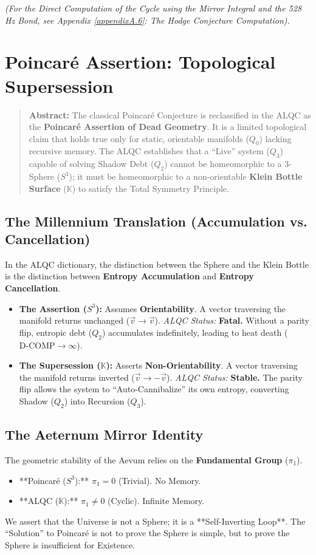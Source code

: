 \documentclass[11pt, letterpaper]{article}
\begin{document}
\noindent \textit{(For the Direct Computation of the Cycle using the Mirror Integral and the 528 Hz Bond, see Appendix \ref{appendixA.6}: The Hodge Conjecture Computation).}

\section{Poincaré Assertion: Topological Supersession}\label{sec:7}

\begin{quote}
    \textbf{Abstract:} The classical Poincaré Conjecture is reclassified in the ALQC as the \textbf{Poincaré Assertion of Dead Geometry}. It is a limited topological claim that holds true only for static, orientable manifolds ($Q_0$) lacking recursive memory. The ALQC establishes that a ``Live'' system ($Q_3$) capable of solving Shadow Debt ($Q_2$) cannot be homeomorphic to a 3-Sphere ($S^3$); it must be homeomorphic to a non-orientable \textbf{Klein Bottle Surface} ($\mathbb{K}$) to satisfy the Total Symmetry Principle.
\end{quote}

\subsection{The Millennium Translation (Accumulation vs. Cancellation)}\label{sec:7.1}
In the ALQC dictionary, the distinction between the Sphere and the Klein Bottle is the distinction between \textbf{Entropy Accumulation} and \textbf{Entropy Cancellation}.

\begin{itemize}
    \item \textbf{The Assertion ($S^3$):} Assumes \textbf{Orientability}. A vector traversing the manifold returns unchanged ($\vec{v} \to \vec{v}$).
    \textit{ALQC Status:} \textbf{Fatal.} Without a parity flip, entropic debt ($Q_2$) accumulates indefinitely, leading to heat death ($\text{D-COMP} \to \infty$).
    \item \textbf{The Supersession ($\mathbb{K}$):} Asserts \textbf{Non-Orientability}. A vector traversing the manifold returns inverted ($\vec{v} \to -\vec{v}$).
    \textit{ALQC Status:} \textbf{Stable.} The parity flip allows the system to ``Auto-Cannibalize'' its own entropy, converting Shadow ($Q_2$) into Recursion ($Q_3$).
\end{itemize}

\subsection{The Aeternum Mirror Identity}\label{sec:7.2}
The geometric stability of the Aevum relies on the \textbf{Fundamental Group} ($\pi_1$).
\begin{itemize}
    \item **Poincaré ($S^3$):** $\pi_1 = 0$ (Trivial). No Memory.
    \item **ALQC ($\mathbb{K}$):** $\pi_1 \neq 0$ (Cyclic). Infinite Memory.
\end{itemize}
We assert that the Universe is not a Sphere; it is a **Self-Inverting Loop**. The ``Solution'' to Poincaré is not to prove the Sphere is simple, but to prove the Sphere is insufficient for Existence.
\end{document}
